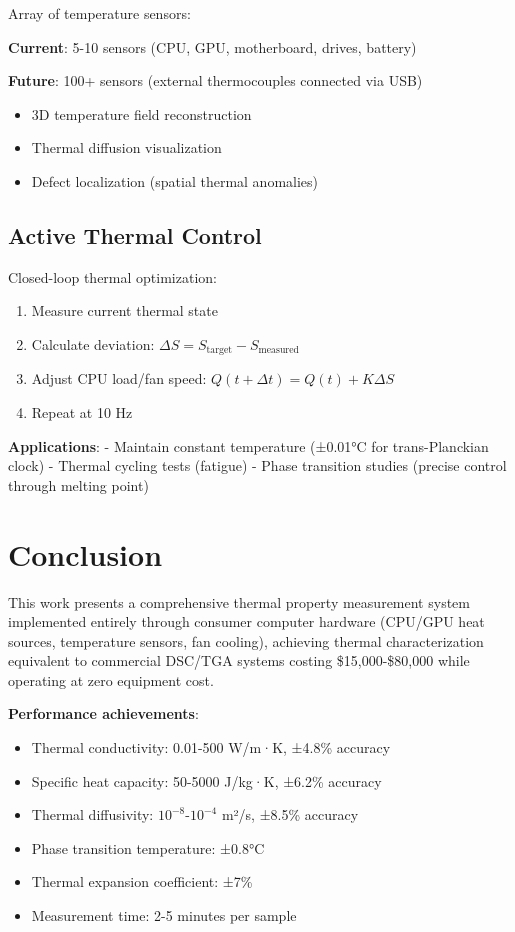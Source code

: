 \documentclass[12pt,a4paper]{article}
\begin{document}
{{Array of temperature sensors:

\textbf{Current}: 5-10 sensors (CPU, GPU, motherboard, drives, battery)

\textbf{Future}: 100+ sensors (external thermocouples connected via USB)
\begin{itemize}
\item 3D temperature field reconstruction
\item Thermal diffusion visualization
\item Defect localization (spatial thermal anomalies)
\end{itemize}

\subsection{Active Thermal Control}

Closed-loop thermal optimization:
\begin{enumerate}
\item Measure current thermal state
\item Calculate deviation: $\Delta S = S_{\text{target}} - S_{\text{measured}}$
\item Adjust CPU load/fan speed: $Q(t+\Delta t) = Q(t) + K \Delta S$
\item Repeat at 10 Hz
\end{enumerate}

\textbf{Applications}:
- Maintain constant temperature (±0.01°C for trans-Planckian clock)
- Thermal cycling tests (fatigue)
- Phase transition studies (precise control through melting point)

\section{Conclusion}

This work presents a comprehensive thermal property measurement system implemented entirely through consumer computer hardware (CPU/GPU heat sources, temperature sensors, fan cooling), achieving thermal characterization equivalent to commercial DSC/TGA systems costing \$15,000-\$80,000 while operating at zero equipment cost.

\textbf{Performance achievements}:
\begin{itemize}
\item Thermal conductivity: 0.01-500 W/m·K, ±4.8\% accuracy
\item Specific heat capacity: 50-5000 J/kg·K, ±6.2\% accuracy
\item Thermal diffusivity: $10^{-8}$-$10^{-4}$ m²/s, ±8.5\% accuracy
\item Phase transition temperature: ±0.8°C
\item Thermal expansion coefficient: ±7\%
\item Measurement time: 2-5 minutes per sample
\end{itemize}

}}
\end{document}
